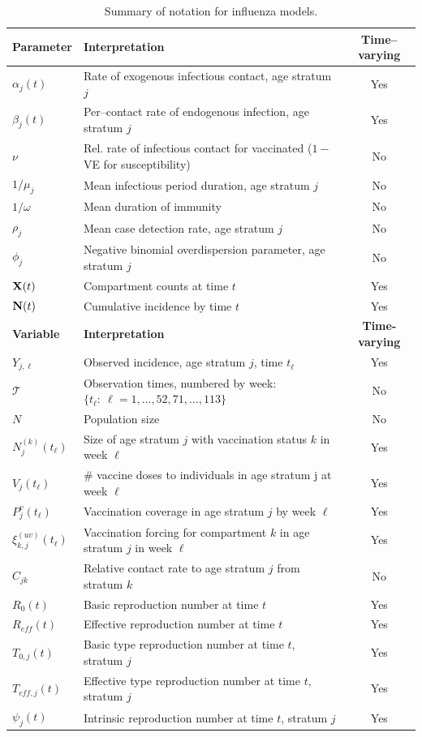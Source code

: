 \begin{table}[htbp]
	\caption{Summary of notation for influenza models.}
	\label{tab:flu_notation}
	\footnotesize
	\centering
	\begin{tabular}{llc}
		\hline
		\textbf{Parameter} & \textbf{Interpretation} & \textbf{Time--varying}\\
		\hline
		$\alpha_j(t)$ & Rate of exogenous infectious contact, age stratum $ j $ & Yes \\
		$ \beta_j(t) $ & Per--contact rate of endogenous infection, age stratum $ j $ & Yes \\
		$ \nu $ & Rel. rate of infectious contact for vaccinated ($ 1- $VE for susceptibility) & No \\
		$1/\mu_j$ & Mean infectious period duration, age stratum $ j $ & No\\
		$ 1/\omega $ & Mean duration of immunity & No \\
		$ \rho_j $ & Mean case detection rate, age stratum $ j $ & No\\
		$ \phi_j $ & Negative binomial overdispersion parameter, age stratum $ j $ & No \\
		$ \mathbf{X}(t) $ & Compartment counts at time $ t $ & Yes\\
		$ \mathbf{N}(t) $ & Cumulative incidence by time $ t $ & Yes \\
		\hline \hline
		\textbf{Variable} & \textbf{Interpretation} & \textbf{Time-varying}\\
		\hline		
		$ Y_{j,\ell} $ & Observed incidence, age stratum $ j $, time $ t_\ell $ & Yes \\
		$ \mathcal{T} $ & Observation times, numbered by week:  $ \lbrace t_\ell:\ \ell=1,\dots,52,71,\dots,113\rbrace $& No \\
		$ N$ & Population size & No\\
		$ N_{j}^{(k)}(t_\ell) $ & Size of age stratum $ j $ with vaccination status $ k $ in week $ \ell $ & Yes \\
		$ V_{j}(t_\ell) $ & \# vaccine doses to individuals in age stratum j at week $ \ell $ & Yes\\	
		$ P^v_{j}(t_\ell) $ & Vaccination coverage in age stratum $ j $ by week $ \ell $ & Yes \\
		$ \xi_{k,j}^{(uv)}(t_\ell) $ & Vaccination forcing for compartment $ k $ in age stratum $ j $ in week $ \ell $ & Yes\\
		$ C_{jk} $ & Relative contact rate to age stratum $ j $ from stratum $ k $ & No\\
		$ R_0(t) $ & Basic reproduction number at time $ t $ & Yes \\
		$ R_{eff}(t) $ & Effective reproduction number at time $ t $ & Yes \\
		$ T_{0,j}(t) $ & Basic type reproduction number at time $ t $, stratum $ j $ & Yes \\
		$ T_{eff,j}(t) $ & Effective type reproduction number at time $ t $, stratum $ j $ & Yes \\
		$ \psi_j(t) $ & Intrinsic reproduction number at time $ t $, stratum $ j $ & Yes\\
		\hline
	\end{tabular}
\end{table}

